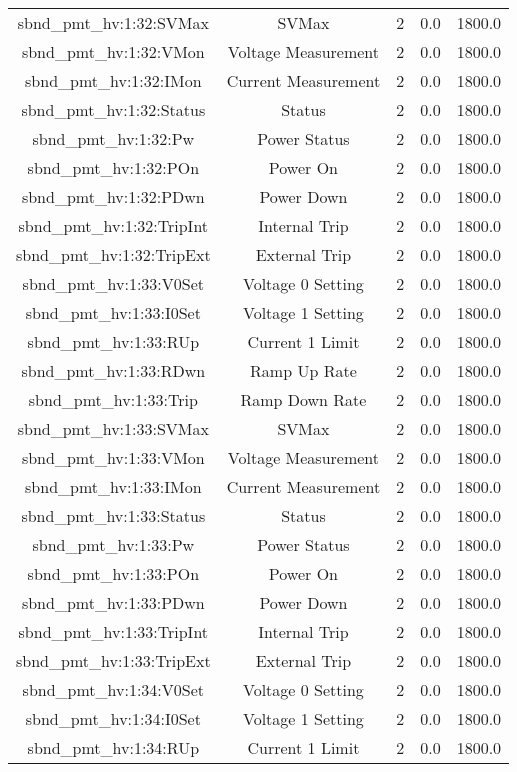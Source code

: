 \begin{center}
\begin{longtable}{c | c c c c }
sbnd\_pmt\_hv:1:32:SVMax & SVMax & 2 & 0.0 & 1800.0\\ 
sbnd\_pmt\_hv:1:32:VMon & Voltage Measurement & 2 & 0.0 & 1800.0\\ 
sbnd\_pmt\_hv:1:32:IMon & Current Measurement & 2 & 0.0 & 1800.0\\ 
sbnd\_pmt\_hv:1:32:Status & Status & 2 & 0.0 & 1800.0\\ 
sbnd\_pmt\_hv:1:32:Pw & Power Status & 2 & 0.0 & 1800.0\\ 
sbnd\_pmt\_hv:1:32:POn & Power On & 2 & 0.0 & 1800.0\\ 
sbnd\_pmt\_hv:1:32:PDwn & Power Down & 2 & 0.0 & 1800.0\\ 
sbnd\_pmt\_hv:1:32:TripInt & Internal Trip & 2 & 0.0 & 1800.0\\ 
sbnd\_pmt\_hv:1:32:TripExt & External Trip & 2 & 0.0 & 1800.0\\ 
sbnd\_pmt\_hv:1:33:V0Set & Voltage 0 Setting & 2 & 0.0 & 1800.0\\ 
sbnd\_pmt\_hv:1:33:I0Set & Voltage 1 Setting & 2 & 0.0 & 1800.0\\ 
sbnd\_pmt\_hv:1:33:RUp & Current 1 Limit & 2 & 0.0 & 1800.0\\ 
sbnd\_pmt\_hv:1:33:RDwn & Ramp Up Rate & 2 & 0.0 & 1800.0\\ 
sbnd\_pmt\_hv:1:33:Trip & Ramp Down Rate & 2 & 0.0 & 1800.0\\ 
sbnd\_pmt\_hv:1:33:SVMax & SVMax & 2 & 0.0 & 1800.0\\ 
sbnd\_pmt\_hv:1:33:VMon & Voltage Measurement & 2 & 0.0 & 1800.0\\ 
sbnd\_pmt\_hv:1:33:IMon & Current Measurement & 2 & 0.0 & 1800.0\\ 
sbnd\_pmt\_hv:1:33:Status & Status & 2 & 0.0 & 1800.0\\ 
sbnd\_pmt\_hv:1:33:Pw & Power Status & 2 & 0.0 & 1800.0\\ 
sbnd\_pmt\_hv:1:33:POn & Power On & 2 & 0.0 & 1800.0\\ 
sbnd\_pmt\_hv:1:33:PDwn & Power Down & 2 & 0.0 & 1800.0\\ 
sbnd\_pmt\_hv:1:33:TripInt & Internal Trip & 2 & 0.0 & 1800.0\\ 
sbnd\_pmt\_hv:1:33:TripExt & External Trip & 2 & 0.0 & 1800.0\\ 
sbnd\_pmt\_hv:1:34:V0Set & Voltage 0 Setting & 2 & 0.0 & 1800.0\\ 
sbnd\_pmt\_hv:1:34:I0Set & Voltage 1 Setting & 2 & 0.0 & 1800.0\\ 
sbnd\_pmt\_hv:1:34:RUp & Current 1 Limit & 2 & 0.0 & 1800.0\\ 

\end{longtable}
\end{center}
